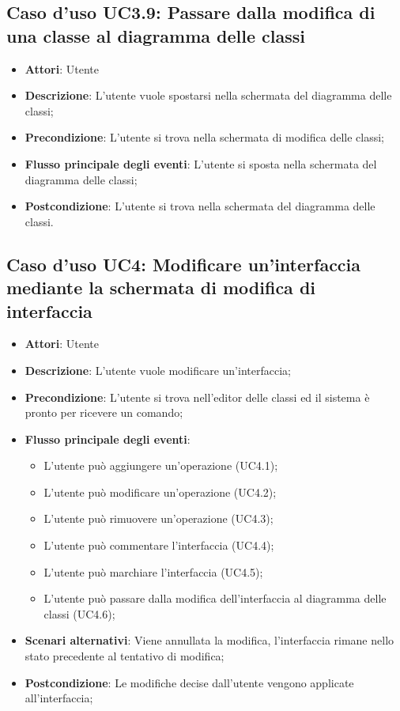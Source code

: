 \documentclass[../AnalisiDeiRequisiti.tex]{subfiles}
\begin{document}
			\subsection{Caso d'uso UC3.9: Passare dalla modifica di una classe al diagramma delle classi}
			\begin{itemize}
				\item \textbf{Attori}: Utente
				\item \textbf{Descrizione}: L'utente vuole spostarsi nella schermata del diagramma delle classi;
				\item \textbf{Precondizione}: L'utente si trova nella schermata di modifica delle classi;
				\item \textbf{Flusso principale degli eventi}: L'utente si sposta nella schermata del diagramma delle classi;
				\item \textbf{Postcondizione}: L'utente si trova nella schermata del diagramma delle classi.
			\end{itemize}
			\subsection{Caso d'uso UC4: Modificare un'interfaccia mediante la schermata di modifica di interfaccia}
			\begin{itemize}
				\item \textbf{Attori}: Utente
				\item \textbf{Descrizione}: L'utente vuole modificare un'interfaccia;
				\item \textbf{Precondizione}: L'utente si trova nell'editor delle classi ed il sistema è pronto per ricevere un comando;
				\item \textbf{Flusso principale degli eventi}: \begin{itemize}
					\item L'utente può aggiungere un'operazione (UC4.1);
					\item L'utente può modificare un'operazione (UC4.2);
					\item L'utente può rimuovere un'operazione (UC4.3);
					\item L'utente può commentare l'interfaccia (UC4.4);
					\item L'utente può marchiare l'interfaccia (UC4.5);
					\item L'utente può passare dalla modifica dell'interfaccia al diagramma delle classi (UC4.6);
				\end{itemize}
				\item \textbf{Scenari alternativi}: Viene annullata la modifica, l'interfaccia rimane nello stato precedente al tentativo di modifica;
				\item \textbf{Postcondizione}: Le modifiche decise dall'utente vengono applicate all'interfaccia;
			\end{itemize}
\end{document}
